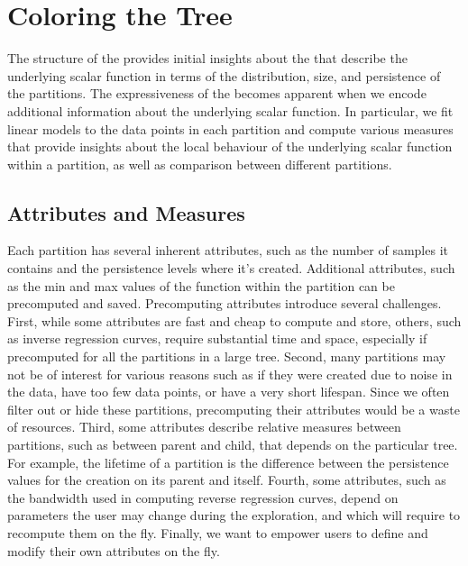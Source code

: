 
\vspace{-.05in}
\section{Coloring the Tree}
\label{sec:analysis}
The structure of the \RT provides initial insights about the \MSC that describe the underlying scalar function in terms of the distribution, size, and persistence of the partitions. The expressiveness of the \RT becomes apparent when we encode additional information about the underlying scalar function. In particular, we fit linear models to the data points in each partition and compute various measures that provide insights about the local behaviour of the underlying scalar function within a partition, as well as comparison between different partitions. 


\subsection{Attributes and Measures}



Each partition has several inherent attributes, such as the number of samples it contains and the persistence levels where it's created. Additional attributes, such as the min and max values of the function within the partition can be precomputed and saved. Precomputing attributes introduce several challenges. First, while some attributes are fast and cheap to compute and store, others, such as inverse regression curves, require substantial time and space, especially if precomputed for all the partitions in a large tree. Second, many partitions may not be of interest for various reasons such as if they were created due to noise in the data, have too few data points, or have a very short lifespan. Since we often filter out or hide these partitions, precomputing their attributes would be a waste of resources. Third, some attributes describe relative measures between partitions, such as between parent and child, that depends on the particular tree. For example, the lifetime of a partition is the difference between the persistence values for the creation on its parent and itself. Fourth, some attributes, such as the bandwidth used in computing reverse regression curves, depend on parameters the user may change during the exploration, and which will require to recompute them on the fly. Finally, we want to empower users to define and modify their own attributes on the fly.

